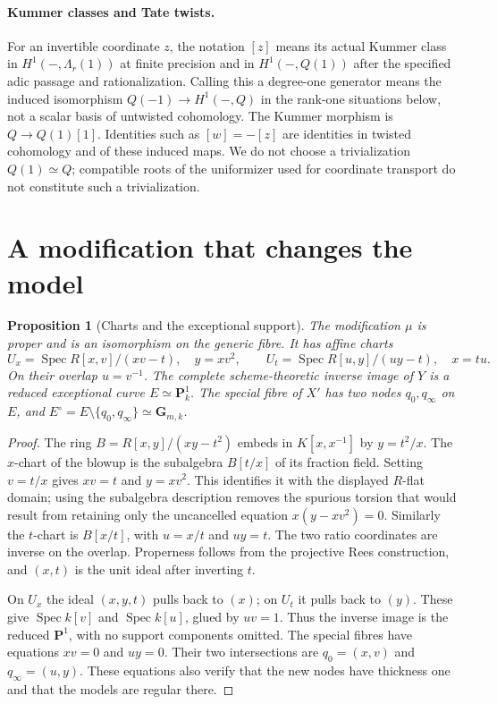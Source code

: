 \documentclass[11pt]{article}
\newtheorem{proposition}[theorem]{Proposition}
\theoremstyle{definition}
\theoremstyle{remark}
\newcommand{\Spec}{\operatorname{Spec}}
\begin{document}
\paragraph{Kummer classes and Tate twists.}
For an invertible coordinate $z$, the notation $[z]$ means its actual
Kummer class in $H^1(-,\Lambda_r(1))$ at finite precision and in
$H^1(-,Q(1))$ after the specified adic passage and rationalization.
Calling this a degree-one generator means the induced isomorphism
$Q(-1)\to H^1(-,Q)$ in the rank-one situations below, not a scalar
basis of untwisted cohomology.  The Kummer morphism is
$Q\to Q(1)[1]$.  Identities such as $[w]=-[z]$ are identities in
twisted cohomology and of these induced maps.  We do not choose a
trivialization $Q(1)\simeq Q$; compatible roots of the uniformizer
used for coordinate transport do not constitute such a trivialization.

\section{A modification that changes the model}
\begin{proposition}[Charts and the exceptional support]\label{prop:charts}
The modification $\mu$ is proper and is an isomorphism on the generic
fibre.  It has affine charts
\[
 U_x=\Spec R[x,v]/(xv-t),\quad y=xv^2,
 \qquad U_t=\Spec R[u,y]/(uy-t),\quad x=tu.
\]
On their overlap $u=v^{-1}$.  The complete scheme-theoretic inverse image
of $Y$ is a reduced exceptional curve $E\simeq\mathbf P^1_k$.
The special fibre of $X'$ has two nodes $q_0,q_\infty$ on $E$, and
$E^\circ=E\setminus\{q_0,q_\infty\}\simeq\mathbf G_{m,k}$.
\end{proposition}
\begin{proof}
The ring $B=R[x,y]/(xy-t^2)$ embeds in $K[x,x^{-1}]$ by $y=t^2/x$.
The $x$-chart of the blowup is the subalgebra $B[t/x]$ of its fraction
field.  Setting $v=t/x$ gives $xv=t$ and $y=xv^2$.  This identifies it
with the displayed $R$-flat domain; using the subalgebra description
removes the spurious torsion that would result from retaining only the
uncancelled equation $x(y-xv^2)=0$.  Similarly the $t$-chart is $B[x/t]$,
with $u=x/t$ and $uy=t$.  The two ratio coordinates are inverse on the
overlap.  Properness follows from the projective Rees construction, and
$(x,t)$ is the unit ideal after inverting $t$.

On $U_x$ the ideal $(x,y,t)$ pulls back to $(x)$; on $U_t$ it pulls back
to $(y)$.  These give $\Spec k[v]$ and $\Spec k[u]$, glued by $uv=1$.
Thus the inverse image is the reduced $\mathbf P^1$, with no support
components omitted.  The special fibres have equations $xv=0$ and
$uy=0$.  Their two intersections are $q_0=(x,v)$ and
$q_\infty=(u,y)$.  These equations also verify that the new nodes have
thickness one and that the models are regular there.
\end{proof}
\end{document}
